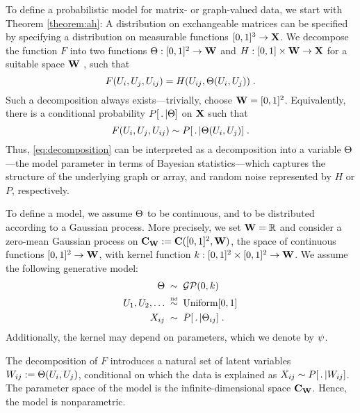 To define a probabilistic model for matrix- or graph-valued data, we start with Theorem \ref{theorem:ah}: A distribution on exchangeable matrices
can be specified by specifying a distribution on measurable functions $[0,1]^3\rightarrow\mathbf{X}$. 
We decompose the function $F$ into two functions 
${\Theta:[0,1]^2\rightarrow\mathbf{W}}$ 
and ${H:[0,1]\times\mathbf{W}\rightarrow\mathbf{X}}$ for a suitable space $\mathbf{W}$ , such that
\begin{equation}
  \label{eq:decomposition}
  F(U_i,U_j,U_{ij})=H(U_{ij},\Theta(U_i,U_j))\;.
\end{equation}
Such a decomposition always exists---trivially, choose $\mathbf{W}=[0,1]^2$.
Equivalently, there is a conditional probability $P[\,.\,|\Theta]$ on $\mathbf{X}$ such that
\begin{equation}
  \label{eq:decomposition:sampling}
  F(U_i,U_j,U_{ij})\sim P[\,.\,|\Theta(U_i,U_j)]\;.
\end{equation}
Thus, \eqref{eq:decomposition} can be interpreted as a decomposition into a variable $\Theta$---the model parameter in terms of Bayesian statistics---which captures the structure of the underlying graph or array,
and random noise represented by $H$ or $P$, respectively.

To define a model, we assume $\Theta$ to be continuous, and to be distributed according to a Gaussian process. More precisely,
we set ${\mathbf{W} = \mathbb{R}}$ and consider a zero-mean Gaussian process on 
$\mathbf{C}_{\mathbf{W}}:=\mathbf{C}([0,1]^2,\mathbf{W})$, the space of continuous functions $[0,1]^2\rightarrow\mathbf{W}$,
with kernel function 
${k:[0,1]^2\times[0,1]^2\rightarrow\mathbf{W}}$.
We assume the following generative model:
\begin{equation}
  \label{eq:model}
  \begin{split}
    \Theta\; &\sim\; \mathcal{GP}(0,k) \\
    U_{1},U_{2},\ldots\; &\overset{\mbox{\tiny iid}}{\sim}\; \mbox{\rm Uniform}[0,1] \\
    X_{ij}\; &\sim\; P[\,.\,|\Theta_{ij}] \;.
  \end{split}
\end{equation}
Additionally, the kernel may depend on parameters, which we denote by $\psi$.

The decomposition of $F$ introduces a natural set of latent variables $W_{ij}:=\Theta(U_i,U_j)$, conditional on which the
data is explained as $X_{ij}\sim P[\,.\,|W_{ij}]$. 
The parameter space of the model is the infinite-dimensional space $\mathbf{C}_{\mathbf{W}}$.
Hence, the model is nonparametric.

